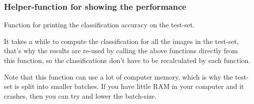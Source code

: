 \documentclass[11pt]{article}
\begin{document}
    \subsubsection{Helper-function for showing the
performance}\label{helper-function-for-showing-the-performance}

    Function for printing the classification accuracy on the test-set.

It takes a while to compute the classification for all the images in the
test-set, that's why the results are re-used by calling the above
functions directly from this function, so the classifications don't have
to be recalculated by each function.

Note that this function can use a lot of computer memory, which is why
the test-set is split into smaller batches. If you have little RAM in
your computer and it crashes, then you can try and lower the batch-size.
\end{document}
